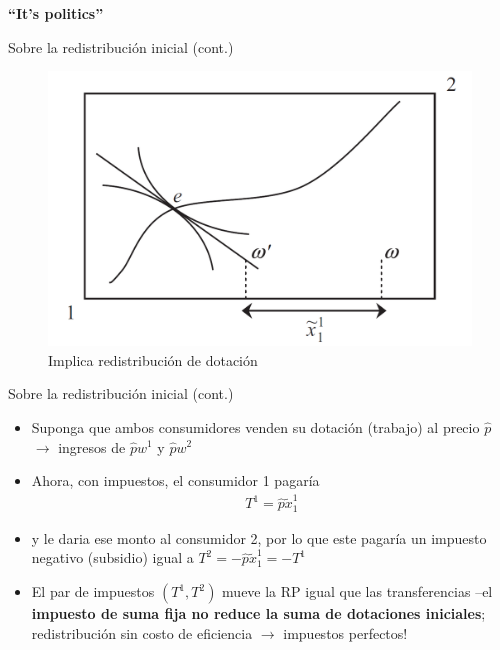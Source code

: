 \documentclass[
  ignorenonframetext,
]{beamer}
\providecommand{\tightlist}{%
  \setlength{\itemsep}{0pt}\setlength{\parskip}{0pt}}\usepackage{longtable,booktabs,array}
\begin{document}
\begin{frame}{\textbf{``It's politics''}}
\begin{block}{Sobre la redistribución inicial (cont.)}
\protect\hypertarget{sobre-la-redistribuciuxf3n-inicial-cont.-3}{}
\begin{figure}

{\centering \includegraphics{../epol/fig/fig-01-009.png}

}

\caption{Implica redistribución de dotación}

\end{figure}
\end{block}

\begin{block}{Sobre la redistribución inicial (cont.)}
\protect\hypertarget{sobre-la-redistribuciuxf3n-inicial-cont.-4}{}
\begin{itemize}
\tightlist
\item
  Suponga que ambos consumidores venden su dotación (trabajo) al precio
  \(\hat{p}\) \(\longrightarrow\) ingresos de \(\hat{p}w^{1}\) y
  \(\hat{p}w^{2}\)
\item
  Ahora, con impuestos, el consumidor 1 pagaría \[\begin{aligned}
  T^{1}=\hat{p}\tilde{x}_{1}^{1}
  \end{aligned}\]
\item
  y le daria ese monto al consumidor 2, por lo que este pagaría un
  impuesto negativo (subsidio) igual a
  \(T^2=-\hat{p}\tilde{x}_{1}^{1}=-T^{1}\)
\item
  El par de impuestos \(\left(T^{1},T^{2}\right)\) mueve la RP igual que
  las transferencias --el \textbf{impuesto de suma fija no reduce la
  suma de dotaciones iniciales}; redistribución sin costo de eficiencia
  \(\longrightarrow\) impuestos perfectos!
\end{itemize}
\end{block}


\end{frame}
\end{document}
